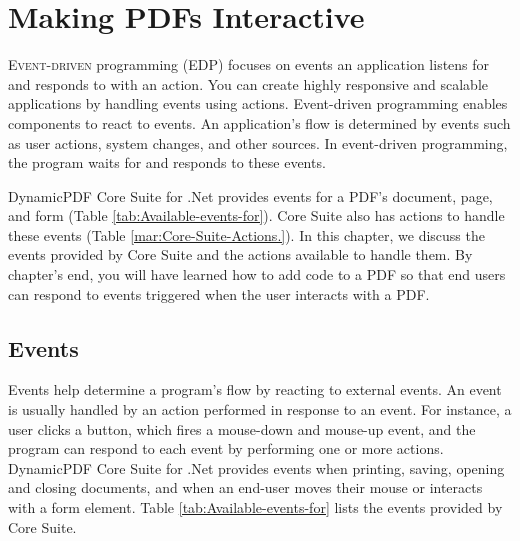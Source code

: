 \documentclass[american,letterpaper]{tufte-book}
\numberwithin{equation}{section}
\numberwithin{figure}{section}
\def\color#1{}%
\begin{document}
{\color{white}
\chapter{Making PDFs Interactive}\label{chap:Actions-and-Events}
\color{black}
\BgThispage
\vspace{8.0em}
\lettrine[lines=2,lhang=0.1]{E}{vent-driven} programming (EDP) focuses on events an application listens
for and responds to with an action. You can create highly responsive
and scalable applications by handling events using actions. Event-driven
programming enables components to react to events. An application's
flow is determined by events such as user actions, system changes,
and other sources. In event-driven programming, the program waits
for and responds to these events.

DynamicPDF Core Suite for .Net provides events for a PDF's document,
page, and form (Table \ref{tab:Available-events-for}). Core Suite
also has actions to handle these events (Table \ref{mar:Core-Suite-Actions.}).
In this chapter, we discuss the events provided by Core Suite and
the actions available to handle them. By chapter's end, you will have
learned how to add code to a PDF so that end users can respond to
events triggered when the user interacts with a PDF.

\section{Events}

Events help determine a program's flow by reacting to external events.
An event is usually handled by an action performed in response to
an event. For instance, a user clicks a button, which fires a mouse-down
and mouse-up event, and the program can respond to each event by performing
one or more actions. DynamicPDF Core Suite for .Net provides events
when printing, saving, opening and closing documents, and when an
end-user moves their mouse or interacts with a form element. Table
\ref{tab:Available-events-for} lists the events provided by Core
Suite.

}
\end{document}
